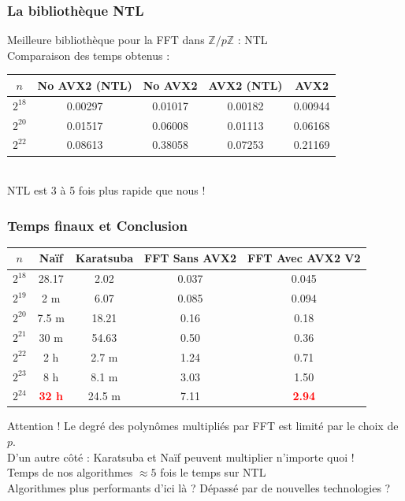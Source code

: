 \documentclass[8pt]{beamer}
\begin{document}
\begin{frame}
\frametitle{La bibliothèque NTL}

Meilleure bibliothèque pour la FFT dans $\mathbb{Z}/p\mathbb{Z}$ : NTL\\[0.3cm]

Comparaison des temps obtenus : \\[0.3cm]

\begin{center}
\begin{tabular}{||c c c c c||}
\hline
$n$ & No AVX2 (NTL) & No AVX2 & AVX2 (NTL) & AVX2 \\
\hline\hline
$2^{18}$ & 0.00297 & 0.01017 & 0.00182 & 0.00944 \\
\hline
$2^{20}$ & 0.01517 & 0.06008 & 0.01113 & 0.06168 \\
\hline
$2^{22}$ & 0.08613 & 0.38058 & 0.07253 & 0.21169 \\
\hline
\end{tabular}
\end{center}
\ \\[0.3cm]
NTL est 3 à 5 fois plus rapide que nous !

\end{frame}

\begin{frame}
\frametitle{Temps finaux et Conclusion}

\begin{center}
\begin{tabular}{||c c c c c||}
\hline
$n$ & Naïf & Karatsuba & FFT Sans AVX2 & FFT Avec AVX2 V2 \\
\hline\hline
$2^{18}$ & 28.17 & 2.02 & 0.037 & 0.045 \\
\hline
$2^{19}$ & 2 m & 6.07 & 0.085 & 0.094 \\
\hline
$2^{20}$ & 7.5 m & 18.21 & 0.16 & 0.18 \\
\hline
$2^{21}$ & 30 m & 54.63 & 0.50 & 0.36 \\
\hline
$2^{22}$ & 2 h & 2.7 m & 1.24 & 0.71 \\
\hline
$2^{23}$ & 8 h & 8.1 m & 3.03 & 1.50 \\
\hline
$2^{24}$ & \textbf{\textcolor{red}{32 h}} & 24.5 m & 7.11 & \textbf{\textcolor{red}{2.94}} \\
\hline
\end{tabular}
\end{center}
{}

Attention ! Le degré des polynômes multipliés par FFT est limité par le choix de $p$.\\
D'un autre côté : Karatsuba et Naïf peuvent multiplier n'importe quoi !\\[0.2cm]

Temps de nos algorithmes $\approx 5$ fois le temps sur NTL \\[0.2cm]
Algorithmes plus performants d'ici là ? Dépassé par de nouvelles technologies ?\\[0.2cm]

\end{frame}
\end{document}
